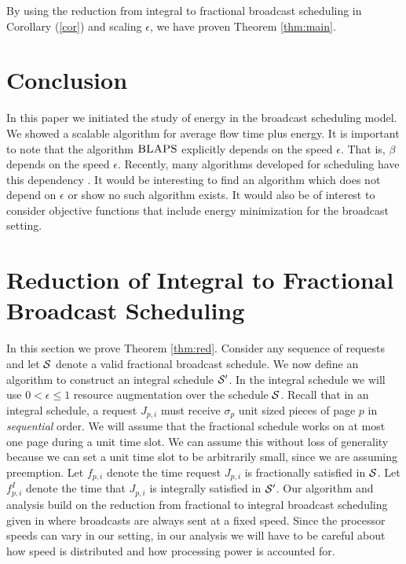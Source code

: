 \documentclass[11pt]{article}
\newcommand{\eps}{\epsilon}
\newcommand{\blaps}{\textrm{\sc BLAPS}}
\newcommand{\cS}{{\cal S}}
\begin{document}
By using  the reduction from integral to fractional broadcast scheduling in Corollary (\ref{cor}) and scaling $\eps$, we have proven Theorem \ref{thm:main}.



\section{Conclusion}

In this paper we initiated the study of energy in the broadcast scheduling model.  We showed a scalable algorithm for average flow time plus energy.  It is important to note that the algorithm $\blaps$ explicitly depends on the speed $\eps$. That is, $\beta$ depends on the speed $\eps$. Recently,  many algorithms developed for scheduling have this dependency \cite{ChekuriIM09,EdmondsP09,GuptaIKMP10}.  It would be interesting to find an algorithm which does not depend on $\eps$ or show no such algorithm exists.  It would also be of interest to consider objective functions that include energy minimization for the broadcast setting.






\appendix

\section{Reduction of Integral to Fractional Broadcast Scheduling}\label{sec:red}

In this section we prove Theorem \ref{thm:red}. Consider any sequence of requests and let $\cS$ denote a valid fractional broadcast schedule.   We now define an algorithm to construct an integral schedule $\cS'$.  In the integral schedule we will use $0 <\eps \leq 1$ resource augmentation over the schedule $\cS$.  Recall that in an integral schedule, a request $J_{p,i}$ must receive $\sigma_p$ unit sized pieces of page $p$ in \emph{sequential} order.  We will assume that the fractional schedule works on at most one page during a unit time slot.  We can assume this without loss of generality because we can set a unit time slot to be arbitrarily small, since we are assuming preemption. Let $f_{p,i}$ denote the time request $J_{p,i}$ is fractionally satisfied in $\cS$.  Let $f^I_{p,i}$ denote the time that $J_{p,i}$ is integrally satisfied in $\cS'$. Our algorithm and analysis build on the reduction from fractional to integral broadcast scheduling given in  \cite{BansalKN09} where broadcasts are always sent at a fixed speed. Since the processor speeds can vary in our setting, in our analysis we will have to be careful about how speed is distributed and how processing power is accounted for.
\end{document}
